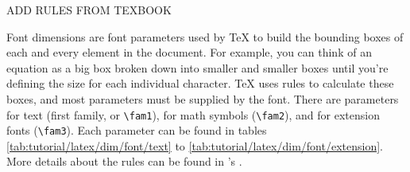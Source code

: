\vfill
\begin{center}
    \Huge \MakeUppercase{Add rules from \TeX{}book}
\end{center}
\vfill

Font dimensions are font parameters used by \TeX{} to build the bounding boxes of each and every element in the document. For example, you can think of an equation as a big box broken down into smaller and smaller boxes until you're defining the size for each individual character. \TeX{} uses rules to calculate these boxes, and most parameters must be supplied by the font. There are parameters for text (first family, or \texttt{\textbackslash{}fam1}), for math symbols (\texttt{\textbackslash{}fam2}), and for extension fonts (\texttt{\textbackslash{}fam3}). Each parameter can be found in tables \ref{tab:tutorial/latex/dim/font/text} to \ref{tab:tutorial/latex/dim/font/extension}. More details about the rules can be found in 's  \parencite{book:knuth-typesetting-a}.

\begingroup
    \setlength{\columnA}{\dimexpr .25\linewidth}
    \setlength{\columnB}{\dimexpr .25\linewidth}
    \setlength{\columnC}{\dimexpr \linewidth-\columnA-\columnB}
    
    \setlength{\columnA}{\columnA-2\tabcolsep-4\vbar/3}
    \setlength{\columnB}{\columnB-2\tabcolsep-4\vbar/3}
    \setlength{\columnC}{\columnC-2\tabcolsep-4\vbar/3}
    
